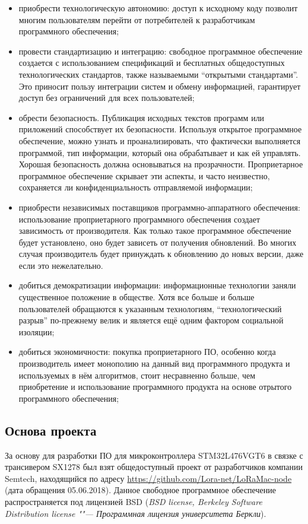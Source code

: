 \begin{itemize}
 \item приобрести технологическую автономию: доступ к исходному коду позволит 
многим пользователям перейти от потребителей к разработчикам программного 
обеспечения;
 \item провести стандартизацию и интеграцию: свободное программное обеспечение 
создается с использованием спецификаций и бесплатных общедоступных 
технологических стандартов, также называемыми ``открытыми стандартами''. Это 
приносит пользу интеграции систем и обмену информацией, гарантирует 
 доступ без ограничений для всех пользователей;
 \item обрести безопасность. Публикация исходных текстов программ или 
приложений способствует их безопасности. Используя открытое программное 
обеспечение, можно узнать и проанализировать, что фактически выполняется 
программой, тип информации, который она обрабатывает и как ей управлять. Хорошая 
безопасность должна основываться на прозрачности. Проприетарное программное 
обеспечение скрывает эти аспекты, и часто неизвестно, сохраняется ли 
конфиденциальность отправляемой информации;
 \item приобрести независимых поставщиков программно-аппаратного обеспечения: 
использование проприетарного программного обеспечения создает зависимость от 
производителя. Как только такое программное обеспечение будет установлено, оно 
будет зависеть от получения обновлений. Во многих случая производитель будет 
принуждать к обновлению до новых версии, даже если это нежелательно.
 \item добиться демократизации информации: информационные технологии заняли 
существенное положение в обществе. Хотя все больше и больше пользователей 
обращаются к указанным технологиям, ``технологический разрыв'' по-прежнему велик 
и является ещё одним фактором социальной изоляции;
 \item добиться экономичности: покупка проприетарного ПО, особенно когда 
производитель имеет монополию на данный вид программного продукта и 
используемых в нём алгоритмов, стоит несравненно больше, чем приобретение и 
использование программного продукта на основе отрытого программного 
обеспечения;
\end{itemize}

\subsection{Основа проекта}

За основу для разработки ПО для микроконтроллера STM32L476VGT6 в связке с 
трансивером SX1278 был взят общедоступный проект от разработчиков компании 
Semtech, находящийся по адресу \url{https://github.com/Lora-net/LoRaMac-node} 
(дата обращения 05.06.2018).
Данное свободное программное обеспечение распространяется под лицензией BSD 
(\textit{BSD license, Berkeley Software Distribution license ""--- Программная 
лицензия университета Беркли}).

